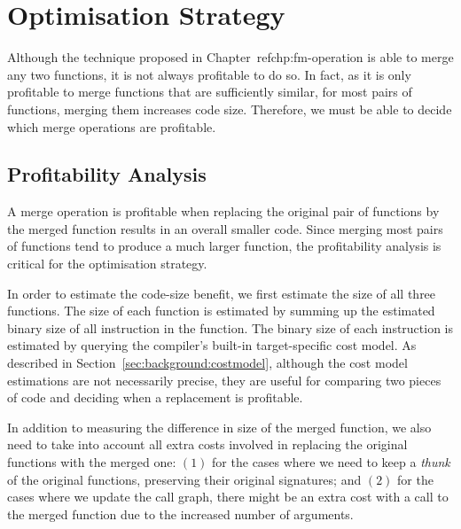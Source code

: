 \chapter{Optimisation Strategy} \label{chp:opt-strategy}

Although the technique proposed in Chapter~ref{chp:fm-operation} is able to merge any two functions, it is not always profitable to do so.
In fact, as it is only profitable to merge functions that are sufficiently similar, for most pairs of functions, merging them increases code size.
Therefore, we must be able to decide which merge operations are profitable.

\section{Profitability Analysis}\label{sec:profit-model}

A merge operation is profitable when replacing the original pair of functions by the merged function results in an overall smaller code.
Since merging most pairs of functions tend to produce a much larger function, the profitability analysis is critical for the optimisation strategy.

In order to estimate the code-size benefit, we first estimate the size of all three functions.
The size of each function is estimated by summing up the estimated binary size of all instruction in the function.
The binary size of each instruction is estimated by querying the compiler's built-in target-specific cost model.
As described in Section~\ref{sec:background:costmodel}, although the cost model estimations are not necessarily precise, they are useful for comparing two pieces of code and deciding when a replacement is profitable.


In addition to measuring the difference in size of the merged function, we also need to take into account all extra costs involved in replacing the original functions with the merged one:
$(1)$ for the cases where we need to keep a \textit{thunk} of the original functions, preserving their original signatures; %
and $(2)$ for the cases where we update the call graph, there might be an extra cost with a call to the merged function due to the increased number of arguments.

